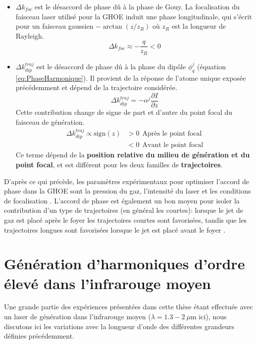 \begin{itemize}
\item $\Delta k_{foc}$ est le désaccord de phase dû à la phase de Gouy. La focalisation du faisceau laser utilisé pour la GHOE induit une phase longitudinale, qui s'écrit pour un faisceau gaussien $- \arctan (z/z_R)$ où $z_R$ est la longueur de Rayleigh.
\begin{equation}
\Delta k_{foc} \approx -\frac{q}{z_R} < 0
\end{equation}
\item $\Delta k_{dip}^{traj}$ est le désaccord de phase dû à la phase du dipôle $\phi_q^j$ (équation \ref{eq:PhaseHarmonique}). Il provient de la réponse de l'atome unique exposée précédemment et dépend de la trajectoire considérée.
\begin{equation}
\Delta k_{dip}^{traj} = - \alpha^j \frac{\partial I}{\partial z}
\end{equation}
Cette contribution change de signe de part et d'autre du point focal du faisceau de génération.
\begin{align}
\Delta k_{dip}^{traj} \propto \text{sign}(z) & > 0 \: \: \text{Après le point focal} \\
& < 0 \: \: \text{Avant le point focal}
\end{align}
Ce terme dépend de la \textbf{position relative du milieu de génération et du point focal}, et est différent pour les deux familles de  \textbf{trajectoires}.
\end{itemize}

D'après ce qui précède, les paramètres expérimentaux pour optimiser l'accord de phase dans la GHOE sont la pression du gaz, l'intensité du laser et les conditions de focalisation . L'accord de phase est également un bon moyen pour isoler la contribution d'un type de trajectoires (en général les courtes): lorsque le jet de gaz est placé après le foyer les trajectoires courtes sont favorisées, tandis que les trajectoires longues sont favorisées lorsque le jet est placé avant le foyer .

\section{Génération d'harmoniques d'ordre élevé dans l'infrarouge moyen}
\label{sec:GHOE_MIR}
Une grande partie des expériences présentées dans cette thèse étant effectuée avec un laser de génération dans l'infrarouge moyen ($\lambda = 1.3 - 2 \: \mu$m ici), nous discutons ici les variations avec la longueur d'onde des différentes grandeurs définies précédemment.

